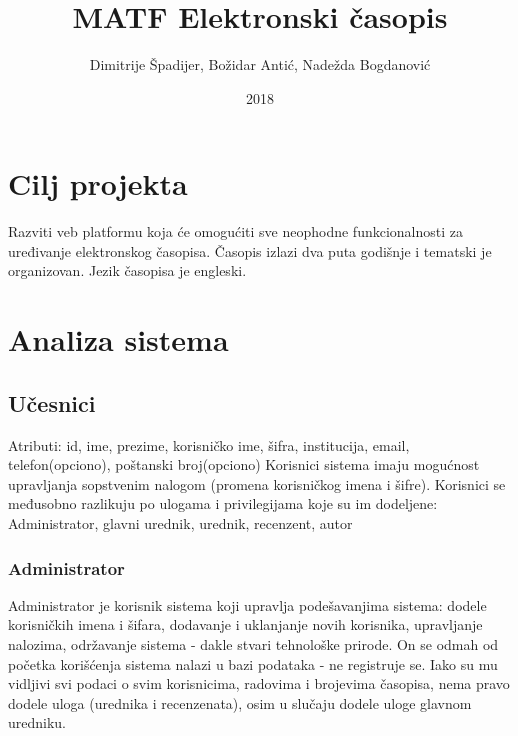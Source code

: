 \documentclass[a4paper]{article}
\title{MATF Elektronski časopis}
\date{2018}
\author{Dimitrije Špadijer, Božidar Antić, Nadežda Bogdanović}
\begin{document}
\maketitle
\newpage
\tableofcontents
\newpage

\section{Cilj projekta}

Razviti veb platformu koja će omogućiti sve neophodne funkcionalnosti za uređivanje elektronskog časopisa. Časopis izlazi dva puta godišnje i tematski je organizovan. Jezik časopisa je engleski.

\section{ Analiza sistema}

\subsection{Učesnici}

    Atributi: id, ime, prezime, korisničko ime, šifra, institucija, email, telefon(opciono), poštanski broj(opciono)
    Korisnici sistema imaju mogućnost upravljanja sopstvenim nalogom (promena korisničkog imena i šifre). Korisnici se međusobno razlikuju po ulogama i privilegijama koje su im dodeljene: Administrator, glavni urednik, urednik, recenzent, autor

    \subsubsection{Administrator}
    Administrator je korisnik sistema koji upravlja podešavanjima sistema: dodele korisničkih imena i šifara, dodavanje i uklanjanje novih korisnika, upravljanje nalozima, održavanje sistema - dakle stvari tehnološke prirode. On se odmah od početka korišćenja sistema nalazi u bazi podataka - ne registruje se. Iako su mu vidljivi svi podaci o svim korisnicima, radovima i brojevima časopisa, nema pravo dodele uloga (urednika i recenzenata), osim u slučaju dodele uloge glavnom uredniku.
\end{document}
